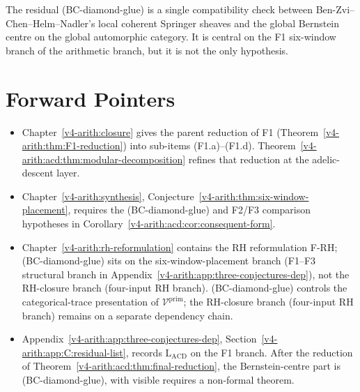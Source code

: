 The residual (BC-diamond-glue) is a single compatibility check
between Ben-Zvi--Chen--Helm--Nadler's local coherent Springer
sheaves and the global Bernstein centre on the global automorphic
category. It is central on the F1 six-window branch of the
arithmetic branch, but it is not the only hypothesis.

\section{Forward Pointers}
\label{v4-arith:acd:forward}

\begin{itemize}
\item Chapter~\ref{v4-arith:closure} gives the parent reduction of F1
(Theorem~\ref{v4-arith:thm:F1-reduction}) into sub-items (F1.a)--(F1.d).
Theorem~\ref{v4-arith:acd:thm:modular-decomposition} refines that reduction
at the adelic-descent layer.
\item Chapter~\ref{v4-arith:synthesis},
Conjecture~\ref{v4-arith:thm:six-window-placement}, requires the
(BC-diamond-glue) and F2/F3 comparison hypotheses in
Corollary~\ref{v4-arith:acd:cor:consequent-form}.
\item Chapter~\ref{v4-arith:rh-reformulation} contains the RH
reformulation F-RH; (BC-diamond-glue) sits on the six-window-placement
branch (F1--F3 structural branch in
Appendix~\ref{v4-arith:app:three-conjectures-dep}), not the
RH-closure branch (four-input RH branch). (BC-diamond-glue) controls the
categorical-trace presentation of \(\mathcal{V}^{\mathrm{prim}}\);
the RH-closure branch (four-input RH branch)
remains on a separate dependency chain.
\item Appendix~\ref{v4-arith:app:three-conjectures-dep},
Section~\ref{v4-arith:app:C:residual-list}, records
\(\mathrm{L}_{\mathrm{ACD}}\) on the F1 branch.  After the reduction of
Theorem~\ref{v4-arith:acd:thm:final-reduction}, the Bernstein-centre part is
(BC-diamond-glue), with visible requires a non-formal theorem.
\end{itemize}
